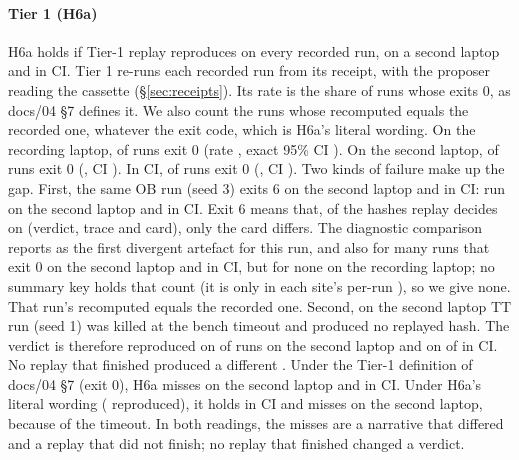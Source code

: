 \paragraph{Tier 1 (H6a)}
H6a holds if Tier-1 replay reproduces  on every recorded run, on a second laptop and in CI.
Tier 1 re-runs each recorded run from its receipt, with the proposer reading the cassette (\S\ref{sec:receipts}).
Its rate is the share of runs whose  exits 0, as docs/04 §7 defines it.
We also count the runs whose recomputed  equals the recorded one, whatever the exit code, which is H6a's literal wording.
On the recording laptop,  of  runs exit 0 (rate , exact 95\% CI ).
On the second laptop,  of  runs exit 0 (, CI ).
In CI,  of  runs exit 0 (, CI ).
Two kinds of failure make up the gap.
First, the same OB run (seed 3) exits 6 on the second laptop and in CI:  run on the second laptop and  in CI.
Exit 6 means that, of the hashes replay decides on (verdict, trace and card), only the card differs.
The diagnostic comparison reports  as the first divergent artefact for this run, and also for many runs that exit 0 on the second laptop and in CI, but for none on the recording laptop; no summary key holds that count (it is only in each site's per-run ), so we give none.
That run's recomputed  equals the recorded one.
Second, on the second laptop  TT run (seed 1) was killed at the bench timeout and produced no replayed hash.
The verdict is therefore reproduced on  of  runs on the second laptop and on  of  in CI.
No replay that finished produced a different .
Under the Tier-1 definition of docs/04 §7 (exit 0), H6a misses on the second laptop and in CI.
Under H6a's literal wording ( reproduced), it holds in CI and misses on the second laptop, because of the timeout.
In both readings, the misses are a narrative that differed and a replay that did not finish; no replay that finished changed a verdict.

